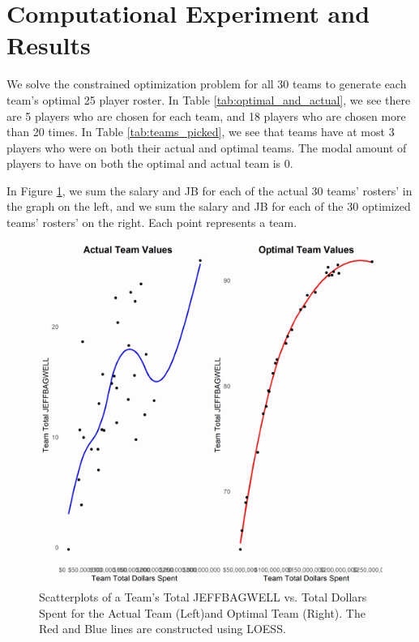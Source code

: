\documentclass{article}
\begin{document}
\label{tab:optimal_and_actual}


\section{Computational Experiment and Results}

We solve the constrained optimization problem for all 30 teams to generate each team's optimal 25 player roster. In Table \ref{tab:optimal_and_actual}, we see there are 5 players who are chosen for each team, and 18 players who are chosen more than 20 times. In Table \ref{tab:teams_picked}, we see that teams have at most 3 players who were on both their actual and optimal teams. The modal amount of players to have on both the optimal and actual team is 0. 

In Figure \ref{fig:cowplot}, we sum the salary and JB for each of the actual 30 teams' rosters' in the graph on the left, and we sum the salary and JB for each of the 30 optimized teams' rosters' on the right. Each point represents a team.


\begin{figure}[h]
\caption{Scatterplots of a Team's Total JEFFBAGWELL vs. Total Dollars Spent for the Actual Team (Left)and Optimal Team (Right). The Red and Blue lines are constructed using LOESS.} 
\label{fig:cowplot}
\centering
\includegraphics[width=0.7\paperwidth, scale=1.25]{bwar_salary_scatter_cowplot.png}
\end{figure}
\end{document}
